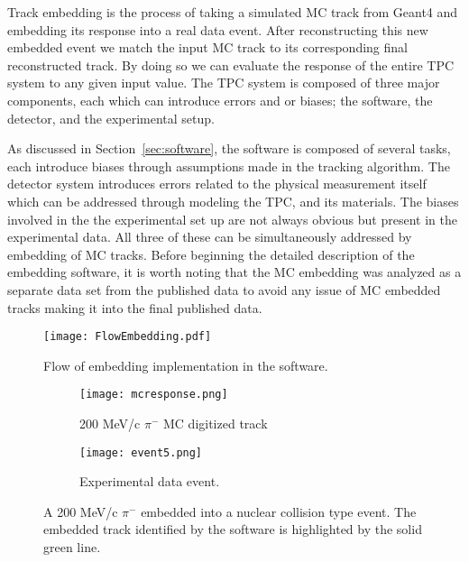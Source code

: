 Track embedding is the process of taking a simulated MC track from Geant4 and embedding its response into a real data event. After reconstructing this new embedded event we match the input MC track to its corresponding final reconstructed track.  By doing so we can evaluate the response of the entire TPC system to any given input value. The TPC system is composed of three major components, each which can introduce errors and or biases; the software, the detector, and the experimental setup.  

As discussed in Section~\ref{sec:software}, the software is composed of several tasks, each introduce biases through assumptions made in the tracking algorithm. The detector system introduces errors related to the physical measurement itself which can be addressed through modeling the TPC, and its materials. The biases involved in the the experimental set up are not always obvious but present in the experimental data. All three of these can be simultaneously addressed by embedding of MC tracks. Before beginning  the detailed description of the embedding software, it is worth noting that the MC embedding was analyzed as a separate data set from the published data to avoid any issue of MC embedded tracks making it into the final published data. 




\begin{figure}[H]
\centering
\texttt{[image: FlowEmbedding.pdf]}
\caption{Flow of embedding implementation in the software.}
\label{fig:flow}
\end{figure}


\begin{figure}[!htb]
    \centering
    \begin{subfigure}[t]{0.49\textwidth}
        \centering
        \texttt{[image: mcresponse.png]}
        \caption{200 MeV/c $\pi^-$ MC digitized track} \label{fig:mcevent}
    \end{subfigure}
    \hfill
    \begin{subfigure}[t]{.49\textwidth}
        \centering
        \texttt{[image: event5.png]} 
        \caption{Experimental data event.} \label{fig:dataevent}
    \end{subfigure}
    \caption{A 200 MeV/c $\pi^-$ embedded into a nuclear collision type event. The embedded track identified by the software is highlighted by the solid green line. }

\label{fig:embedtrack}
\end{figure}



